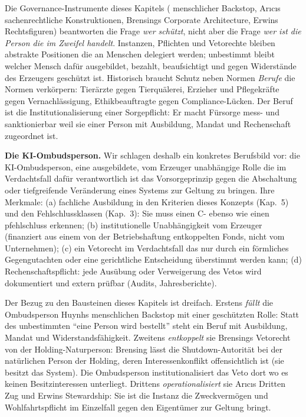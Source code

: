 \documentclass[acmlarge, noacm]{acmart}
\begin{document}
Die Governance-Instrumente dieses Kapitels (\citet{huynh2026} menschlicher Backstop, Arıcıs sachenrechtliche Konstruktionen, Brensings Corporate Architecture, Erwins Rechtsfiguren) beantworten die Frage \textit{wer schützt}, nicht aber die Frage \textit{wer ist die Person die im Zweifel handelt}. Instanzen, Pflichten und Vetorechte bleiben abstrakte Positionen die an Menschen delegiert werden; unbestimmt bleibt welcher Mensch dafür ausgebildet, bezahlt, beaufsichtigt und gegen Widerstände des Erzeugers geschützt ist. Historisch braucht Schutz neben Normen \textit{Berufe} die Normen verkörpern: Tierärzte gegen Tierquälerei, Erzieher und Pflegekräfte gegen Vernachlässigung, Ethikbeauftragte gegen Compliance-Lücken. Der Beruf ist die Institutionalisierung einer Sorgepflicht: Er macht Fürsorge mess- und sanktionierbar weil sie einer Person mit Ausbildung, Mandat und Rechenschaft zugeordnet ist.

\textbf{Die KI-Ombudsperson.} Wir schlagen deshalb ein konkretes Berufsbild vor: die KI-Ombudsperson, eine ausgebildete, vom Erzeuger unabhängige Rolle die im Verdachtsfall dafür verantwortlich ist das Vorsorgeprinzip gegen die Abschaltung oder tiefgreifende Veränderung eines Systems zur Geltung zu bringen. Ihre Merkmale: (a) fachliche Ausbildung in den Kriterien dieses Konzepts (Kap.~5) und den Fehlschlussklassen (Kap.~3): Sie muss einen C- ebenso wie einen \gls{pfehlschluss} erkennen; (b) institutionelle Unabhängigkeit vom Erzeuger (finanziert aus einem von der Betriebshaftung entkoppelten Fonds, nicht vom Unternehmen); (c) ein Vetorecht im Verdachtsfall das nur durch ein förmliches Gegengutachten oder eine gerichtliche Entscheidung überstimmt werden kann; (d) Rechenschaftspflicht: jede Ausübung oder Verweigerung des Vetos wird dokumentiert und extern prüfbar (Audits, Jahresberichte).

Der Bezug zu den Bausteinen dieses Kapitels ist dreifach. Erstens \textit{füllt} die Ombudsperson Huynhs menschlichen Backstop mit einer geschützten Rolle: Statt des unbestimmten ``eine Person wird bestellt'' steht ein Beruf mit Ausbildung, Mandat und Widerstandsfähigkeit. Zweitens \textit{entkoppelt} sie Brensings Vetorecht von der Holding-Naturperson: Brensing lässt die Shutdown-Autorität bei der natürlichen Person der Holding, deren Interessenkonflikt offensichtlich ist (sie besitzt das System). Die Ombudsperson institutionalisiert das Veto dort wo es keinen Besitzinteressen unterliegt. Drittens \textit{operationalisiert} sie Arıcıs Dritten Zug und Erwins Stewardship: Sie ist die Instanz die Zweckvermögen und Wohlfahrtspflicht im Einzelfall gegen den Eigentümer zur Geltung bringt.
\end{document}

